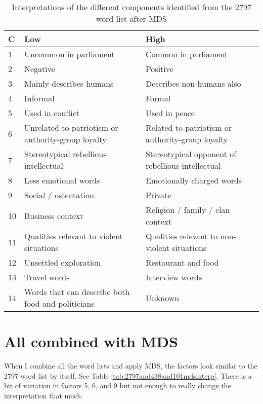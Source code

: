 \begin{table}[tbp]
\begin{tabular}{ | l |p{2in}|p{2in}|}
 \hline
 C & Low & High \\
 \hline
 1 & Uncommon in parliament & Common in parliament\\
 2 & Negative & Positive\\
 3 & Mainly describes humans & Describes non-humans also \\
 4 & Informal & Formal \\
 5 & Used in conflict & Used in peace \\
 6 & Unrelated to patriotism or authority-group loyalty & Related to 
     patriotism or authority-group loyalty \\
 7 & Stereotypical rebellious intellectual & Stereotypical opponent of 
     rebellious intellectual \\
 8 & Less emotional words & Emotionally charged words \\
 9 & Social / ostentation & Private  \\
 10 & Business context & Religion / family / clan context \\
 11 & Qualities relevant to violent situations & Qualities relevant to 
       non-violent situations \\
 12 & Unsettled exploration & Restaurant and food \\
 13 & Travel words & Interview words \\
 14 & Words that can describe both food and politicians &  Unknown \\
 \hline
\end{tabular}
 \caption{Interpretations of the different components identified from the 2797
 word list after MDS}
 \label{tab:2797mdsinterp}
\end{table}

\section{All combined with MDS}

When I combine all the word lists and apply MDS, the factors look similar to 
the 2797 word list by itself. See Table \ref{tab:2797and438and101mdsinterp}. 
There is a bit of variation in factors 5, 6, and 9 but not enough to really 
change the interpretation that much.

